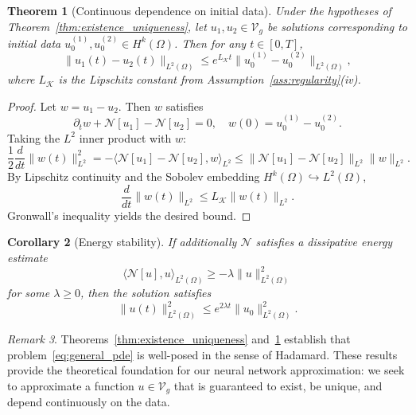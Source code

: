 \documentclass[11pt,reqno]{amsart}
\theoremstyle{plain}
\newtheorem{theorem}{Theorem}[section]
\newtheorem{corollary}[theorem]{Corollary}
\theoremstyle{definition}
\theoremstyle{remark}
\newtheorem{remark}[theorem]{Remark}
\begin{document}
\begin{theorem}[Continuous dependence on initial data]\label{thm:stability}
Under the hypotheses of Theorem~\ref{thm:existence_uniqueness}, let $u_1, u_2 \in \mathcal{V}_g$ be solutions corresponding to initial data $u_0^{(1)}, u_0^{(2)} \in H^k(\Omega)$. Then for any $t \in [0,T]$,
\[
\|u_1(t) - u_2(t)\|_{L^2(\Omega)} \leq e^{L_{\mathcal{K}} t} \|u_0^{(1)} - u_0^{(2)}\|_{L^2(\Omega)},
\]
where $L_{\mathcal{K}}$ is the Lipschitz constant from Assumption~\ref{ass:regularity}(iv).
\end{theorem}

\begin{proof}
Let $w = u_1 - u_2$. Then $w$ satisfies
\[
\partial_t w + \mathcal{N}[u_1] - \mathcal{N}[u_2] = 0, \quad w(0) = u_0^{(1)} - u_0^{(2)}.
\]
Taking the $L^2$ inner product with $w$:
\[
\frac{1}{2}\frac{d}{dt}\|w(t)\|_{L^2}^2 
= -\langle \mathcal{N}[u_1] - \mathcal{N}[u_2], w \rangle_{L^2}
\leq \|\mathcal{N}[u_1] - \mathcal{N}[u_2]\|_{L^2} \|w\|_{L^2}.
\]
By Lipschitz continuity and the Sobolev embedding $H^k(\Omega) \hookrightarrow L^2(\Omega)$,
\[
\frac{d}{dt}\|w(t)\|_{L^2} \leq L_{\mathcal{K}} \|w(t)\|_{L^2}.
\]
Gronwall's inequality yields the desired bound.
\end{proof}

\begin{corollary}[Energy stability]\label{cor:energy_stability}
If additionally $\mathcal{N}$ satisfies a dissipative energy estimate
\[
\langle \mathcal{N}[u], u \rangle_{L^2(\Omega)} \geq -\lambda \|u\|_{L^2(\Omega)}^2
\]
for some $\lambda \geq 0$, then the solution satisfies
\[
\|u(t)\|_{L^2(\Omega)}^2 \leq e^{2\lambda t} \|u_0\|_{L^2(\Omega)}^2.
\]
\end{corollary}

\begin{remark}
Theorems~\ref{thm:existence_uniqueness} and~\ref{thm:stability} establish that problem~\eqref{eq:general_pde} is well-posed in the sense of Hadamard. These results provide the theoretical foundation for our neural network approximation: we seek to approximate a function $u \in \mathcal{V}_g$ that is guaranteed to exist, be unique, and depend continuously on the data.
\end{remark}
\end{document}
